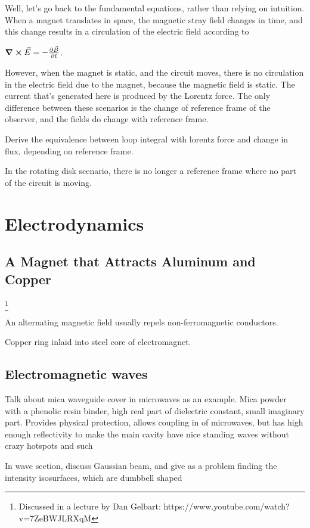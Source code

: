 \documentclass[12pt]{book}
\begin{document}
Well, let's go back to the fundamental equations, rather than relying on intuition.
When a magnet translates in space, the magnetic stray field changes in time, and this change results in a circulation of the electric field according to

$\curl{\vec{E}} = - \pdv{\vec{B}}{t}$.

However, when the magnet is static, and the circuit moves, there is no circulation in the electric field due to the magnet, because the magnetic field is static.
The current that's generated here is produced by the Lorentz force.
The only difference between these scenarios is the change of reference frame of the observer, and the fields do change with reference frame.

	{\color{red} Derive the equivalence between loop integral with lorentz force and change in flux, depending on reference frame.}

In the rotating disk scenario, there is no longer a reference frame where no part of the circuit is moving.

\part{Electrodynamics}

\chapter{A Magnet that Attracts Aluminum and Copper}

\footnote{Discussed in a lecture by Dan Gelbart: https://www.youtube.com/watch?v=7ZeBWJLRXqM}

An alternating magnetic field usually repels non-ferromagnetic conductors.

Copper ring inlaid into steel core of electromagnet.

\chapter{Electromagnetic waves}
Talk about mica waveguide cover in microwaves as an example. Mica powder with a phenolic resin binder, high real part of dielectric constant, small imaginary part.
Provides physical protection, allows coupling in of microwaves, but has high enough reflectivity to make the main cavity have nice standing waves without crazy hotspots and such


In wave section, discuss Gaussian beam, and give as a problem finding the intensity isosurfaces, which are dumbbell shaped

\blinddocument
\end{document}
